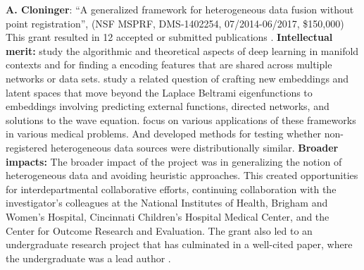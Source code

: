 {\bf A. Cloninger}: ``A generalized framework for heterogeneous data fusion without point registration'', (NSF MSPRF, DMS-1402254, 07/2014-06/2017, \$150,000) This grant resulted in 12 accepted or submitted publications \cite{mishne2017diffusion,cloninger2018bigeometric,shaham2018provable,cloninger2017spectral, cloninger2017note, cloninger2017prediction,cloninger2016function, downing2017describing, bates2017outcome, katzman2018deepsurv,cheng2017two,cloninger2018people}.
{\bf Intellectual merit:} \cite{mishne2017diffusion,cloninger2018bigeometric,shaham2018provable} study the algorithmic and theoretical aspects of deep learning in manifold contexts and for finding a encoding features that are shared across multiple networks or data sets.  \cite{cloninger2017spectral, cloninger2017note, cloninger2017prediction} study a related question of crafting new embeddings and latent spaces that move beyond the Laplace Beltrami eigenfunctions to embeddings involving predicting external functions, directed networks, and solutions to the wave equation.%
\cite{cloninger2016function, downing2017describing, bates2017outcome, katzman2018deepsurv} focus on various applications of these frameworks in various medical problems.  And \cite{cheng2017two,cloninger2018people} developed methods for testing whether non-registered heterogeneous data sources were distributionally similar.
{\bf Broader impacts:}
The broader impact of the project was in generalizing the notion of heterogeneous data and avoiding heuristic approaches.  This created opportunities for interdepartmental collaborative efforts, continuing collaboration with the investigator's colleagues at the National Institutes of Health, Brigham and Women's Hospital, Cincinnati Children's Hospital Medical Center, and the Center for Outcome Research and Evaluation.  The grant also led to an undergraduate research project that has culminated in a well-cited paper, where the undergraduate was a lead author \cite{katzman2018deepsurv}.


